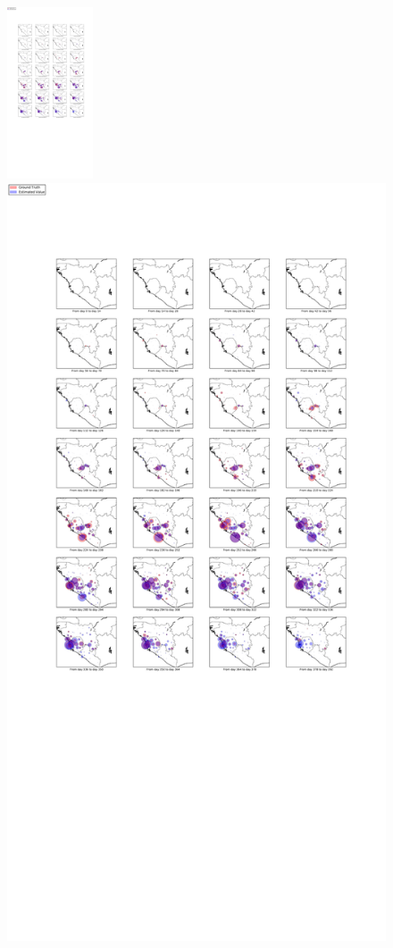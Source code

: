\documentclass[11pt]{article}
\begin{document}
\begin{figure}%
\begin{center}
  \includegraphics[width=1in]{graph/elabel.pdf}

  \includegraphics[width=5.9 in]{graph/ee.pdf}

\end{center}
\end{figure}
\end{document}
